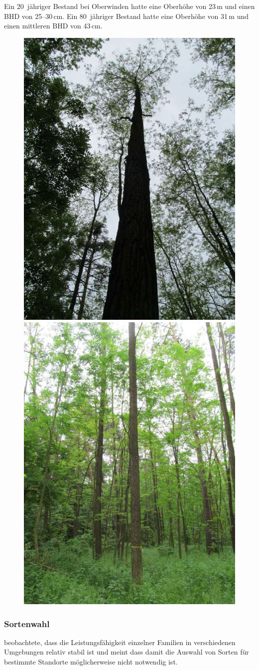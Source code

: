 \documentclass[twocolumn]{scrartcl}
\begin{document}
Ein 20~jähriger Bestand bei Oberwinden hatte eine Oberhöhe von 23\,m
und einen BHD von 25--30\,cm. Ein 80~jähriger Bestand hatte eine
Oberhöhe von 31\,m und einen mittleren BHD von 43\,cm.

\begin{figure}[htbp]
  \centering
  \includegraphics[width=.45\linewidth]{./bild/HerzogenburgRobinie2023a}
  \includegraphics[width=.45\linewidth]{./bild/HerzogenburgRobinie2023b}
  \label{fig:hezogenburg}
\end{figure}

\subsubsection{Sortenwahl}

\citet{bloes1992robinie} beobachtete, dass die Leistungsfähigkeit
einzelner Familien in verschiedenen Umgebungen relativ stabil ist und
meint dass damit die Auswahl von Sorten für bestimmte Standorte
möglicherweise nicht notwendig ist.
\end{document}
